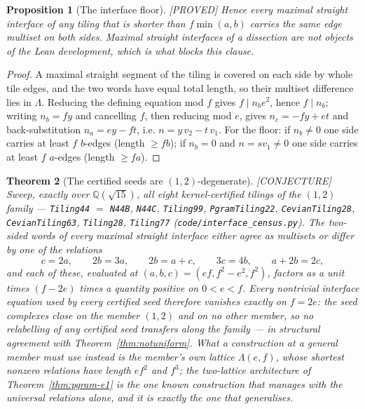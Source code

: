 \documentclass[11pt,reqno]{amsart}
\theoremstyle{plain}
\newtheorem{theorem}{Theorem}
\newtheorem{proposition}[theorem]{Proposition}
\theoremstyle{definition}
\newcommand{\Q}{\mathbb{Q}}
\newcommand{\lab}[1]{\hfill\textnormal{\footnotesize\textsc{[#1]}}}
\begin{document}
\begin{proposition}[The interface floor]\label{prop:interfacefloor}\lab{PROVED}
Hence every maximal straight interface of any tiling that is shorter than $f\min(a,b)$ carries the
same edge multiset on both sides. Maximal straight interfaces of a dissection are not objects of the
Lean development, which is what blocks this clause.
\end{proposition}

\begin{proof}
A maximal straight segment of the tiling is covered on each side by whole tile edges, and the two
words have equal total length, so their multiset difference lies in $\Lambda$. Reducing the
defining equation mod $f$ gives $f\mid n_be^2$, hence $f\mid n_b$; writing $n_b=fy$ and cancelling
$f$, then reducing mod $e$, gives $n_c=-fy+et$ and back-substitution $n_a=ey-ft$, i.e.
$n=y\,v_2-t\,v_1$. For the floor: if $n_b\neq0$ one side carries at least $f$ $b$-edges (length
$\ge fb$); if $n_b=0$ and $n=sv_1\neq0$ one side carries at least $f$ $a$-edges (length $\ge fa$).
\end{proof}

\begin{theorem}[The certified seeds are $(1,2)$-degenerate]\label{thm:seeddegenerate}\lab{CONJECTURE}
Sweep, exactly over $\Q(\sqrt{15})$, all eight kernel-certified tilings of the $(1,2)$ family ---
\texttt{Tiling44} $=$ \texttt{N44B}, \texttt{N44C}, \texttt{Tiling99}, \texttt{PgramTiling22},
\texttt{CevianTiling28}, \texttt{CevianTiling63}, \texttt{Tiling28}, \texttt{Tiling77}
(\texttt{code/interface\_census.py}). The two-sided words of every maximal straight interface
either agree as multisets or differ by one of the relations
\[
c=2a,\qquad 2b=3a,\qquad 2b=a+c,\qquad 3c=4b,\qquad a+2b=2c ,
\]
and each of these, evaluated at $(a,b,c)=(ef,f^2-e^2,f^2)$, factors as a unit times $(f-2e)$
times a quantity positive on $0<e<f$. Every nontrivial interface equation used by every certified
seed therefore vanishes exactly on $f=2e$: \emph{the seed complexes close on the member $(1,2)$
and on no other member}, so no relabelling of any certified seed transfers along the family ---
in structural agreement with Theorem~\ref{thm:notuniform}. What a construction at a general
member must use instead is the member's own lattice $\Lambda(e,f)$, whose shortest nonzero
relations have length $ef^2$ and $f^3$; the two-lattice architecture of
Theorem~\ref{thm:pgram-e1} is the one known construction that manages with the universal
relations alone, and it is exactly the one that generalises.
\end{theorem}
\end{document}
